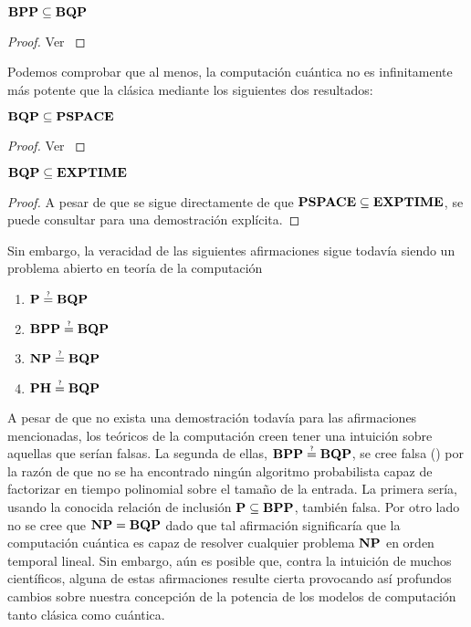 \begin{corol} $\operatorname{\mathbf{BPP}}\subseteq \operatorname{\mathbf{BQP}}$
\end{corol}

\begin{proof}
Ver \cite{arora2009computational}
\end{proof}

Podemos comprobar que al menos, la computación cuántica no es infinitamente más potente que la clásica mediante los siguientes dos resultados:

\begin{teo} $\operatorname{\mathbf{BQP}} \subseteq \operatorname{\mathbf{PSPACE}}$
\end{teo}

\begin{proof}
Ver \cite{arora2009computational}
\end{proof}

\begin{corol}
$\operatorname{\mathbf{BQP}} \subseteq \mathbf{EXPTIME}$
\end{corol}
\begin{proof}
A pesar de que se sigue directamente de que $\operatorname{\mathbf{PSPACE}} \subseteq \mathbf{EXPTIME}$, se puede consultar \cite{book:929225} para una demostración explícita.
\end{proof}


Sin embargo, la veracidad de las siguientes afirmaciones sigue todavía siendo un problema abierto en teoría de la computación
\begin{enumerate}
\item $\PP\myEq{?}\BQP$
\item $\BPP\myEq{?}\BQP$
\item $\NP\myEq{?}\BQP$
\item $\PH\myEq{?}\BQP$
\end{enumerate}

A pesar de que no exista una demostración todavía para las afirmaciones mencionadas, los teóricos de la computación creen tener una intuición sobre aquellas que serían falsas. La segunda de ellas, $\BPP\myEq{?}\BQP$, se cree falsa (\cite{book:929225}) por la razón de que no se ha encontrado ningún algoritmo probabilista capaz de factorizar en tiempo polinomial sobre el tamaño de la entrada. La primera sería, usando la conocida relación de inclusión $\operatorname{\mathbf{P}}\subseteq\operatorname{\mathbf{BPP}}$, también falsa. Por otro lado no se cree que $\operatorname{\mathbf{NP}}=\operatorname{\mathbf{BQP}}$ dado que tal afirmación significaría que la computación cuántica es capaz de resolver cualquier problema $\operatorname{\mathbf{NP}}$ en orden temporal lineal. Sin embargo, aún es posible que, contra la intuición de muchos científicos, alguna de estas afirmaciones resulte cierta provocando así profundos cambios sobre nuestra concepción de la potencia de los modelos de computación tanto clásica como cuántica.\\

